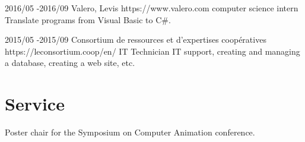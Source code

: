 \documentclass[10pt]{article} %
\begin{document}
\job
{2016/05 -}{2016/09}
{Valero, Levis}
{https://www.valero.com}
{computer science intern}
{Translate programs from Visual Basic to C\#.}

\job
{2015/05 -}{2015/09}
{Consortium de ressources et d'expertises coopératives}
{https://leconsortium.coop/en/}
{IT Technician}
{IT support, creating and managing a database, creating a web site, etc.}










\section{Service}
{
Poster chair for the Symposium on Computer Animation conference.\\
}
\end{document}
